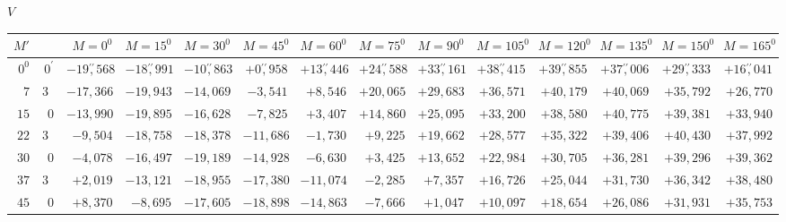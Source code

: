 \begin{landscape}
\clearpage
\endgroup
\clearpage
\begingroup
\fontsize{8.5}{10.5}\selectfont
{}
\renewcommand{\headrulewidth}{0pt}
\begin{center}\(V\)\end{center}
\setlength{\tabcolsep}{2.5pt}
\renewcommand{\arraystretch}{1.08}
\begin{longtable}{@{}rr|r|r|r|r|r|r|r|r|r|r|r|r@{}}
\hline
\(M'\) & & \(M=0^0\) & \(M=15^0\) & \(M=30^0\) & \(M=45^0\) & \(M=60^0\) & \(M=75^0\) & \(M=90^0\) & \(M=105^0\) & \(M=120^0\) & \(M=135^0\) & \(M=150^0\) & \(M=165^0\)\\
\hline
\endhead
\(0^0\) & \(0^\prime\) & \(-19\overset{\prime\prime}{,}568\) & \(-18\overset{\prime\prime}{,}991\) & \(-10\overset{\prime\prime}{,}863\) & \(+0\overset{\prime\prime}{,}958\) & \(+13\overset{\prime\prime}{,}446\) & \(+24\overset{\prime\prime}{,}588\) & \(+33\overset{\prime\prime}{,}161\) & \(+38\overset{\prime\prime}{,}415\) & \(+39\overset{\prime\prime}{,}855\) & \(+37\overset{\prime\prime}{,}006\) & \(+29\overset{\prime\prime}{,}333\) & \(+16\overset{\prime\prime}{,}041\)\\
\(7\) & \(30\) & \(-17{,}366\) & \(-19{,}943\) & \(-14{,}069\) & \(-3{,}541\) & \(+8{,}546\) & \(+20{,}065\) & \(+29{,}683\) & \(+36{,}571\) & \(+40{,}179\) & \(+40{,}069\) & \(+35{,}792\) & \(+26{,}770\)\\
\(15\) & \(0\) & \(-13{,}990\) & \(-19{,}895\) & \(-16{,}628\) & \(-7{,}825\) & \(+3{,}407\) & \(+14{,}860\) & \(+25{,}095\) & \(+33{,}200\) & \(+38{,}580\) & \(+40{,}775\) & \(+39{,}381\) & \(+33{,}940\)\\
\(22\) & \(30\) & \(-9{,}504\) & \(-18{,}758\) & \(-18{,}378\) & \(-11{,}686\) & \(-1{,}730\) & \(+9{,}225\) & \(+19{,}662\) & \(+28{,}577\) & \(+35{,}322\) & \(+39{,}406\) & \(+40{,}430\) & \(+37{,}992\)\\[2pt]
\(30\) & \(0\) & \(-4{,}078\) & \(-16{,}497\) & \(-19{,}189\) & \(-14{,}928\) & \(-6{,}630\) & \(+3{,}425\) & \(+13{,}652\) & \(+22{,}984\) & \(+30{,}705\) & \(+36{,}281\) & \(+39{,}296\) & \(+39{,}362\)\\
\(37\) & \(30\) & \(+2{,}019\) & \(-13{,}121\) & \(-18{,}955\) & \(-17{,}380\) & \(-11{,}074\) & \(-2{,}285\) & \(+7{,}357\) & \(+16{,}726\) & \(+25{,}044\) & \(+31{,}730\) & \(+36{,}342\) & \(+38{,}480\)\\
\(45\) & \(0\) & \(+8{,}370\) & \(-8{,}695\) & \(-17{,}605\) & \(-18{,}898\) & \(-14{,}863\) & \(-7{,}666\) & \(+1{,}047\) & \(+10{,}097\) & \(+18{,}654\) & \(+26{,}086\) & \(+31{,}931\) & \(+35{,}753\)\\

\end{longtable}
\end{landscape}
